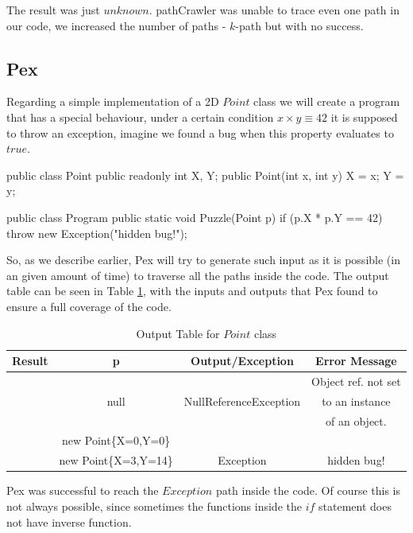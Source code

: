 \documentclass[10pt, conference, compsocconf]{IEEEtran}
\newcommand{\checkK}{\color{ForestGreen}\checkmark}
\newcommand{\cross}{\color{red}\hspace{-3pt}\ding{55}}
\begin{document}
The result was just $unknown$. pathCrawler was unable to trace even one path in our code, we increased the number of paths - $k$-path but with no success.

\subsection{Pex}
Regarding a simple implementation of a 2D $Point$ class we will create a program that has a special behaviour, under a certain condition
$x \times y \equiv 42$ it is supposed to throw an exception, imagine we found a bug when this property evaluates to $true$.

\begin{code}
public class Point  {
  public readonly int X, Y;
  public Point(int x, int y) { X = x; Y = y; }
}

public class Program {
  public static void Puzzle(Point p) {
    if (p.X * p.Y == 42)
        throw new Exception("hidden bug!");
  }
}
\end{code}

So, as we describe earlier, Pex will try to generate such input as it is possible (in an given amount of time) to traverse all the paths inside the code.
The output table can be seen in Table \ref{tab:point}, with the inputs and outputs that Pex found to ensure a full coverage of the code.

\begin{table}[!ht]
\renewcommand{\arraystretch}{1.3}
\setlength{\tabcolsep}{1pt}
\caption{Output Table for $Point$ class}
\label{tab:point}
\centering
\noindent \begin{tabular}{|c|c|c|c|}\hline
Result & p & Output/Exception & Error Message\\\hline
 &  &  & Object ref. not set \\
\cross & null  & NullReferenceException & to an instance \\
 &  &  & of an object.\\\hline
\checkK & new Point\{X=0,Y=0\} & &\\\hline
\cross & new Point\{X=3,Y=14\} & Exception & hidden bug!\\\hline
\end{tabular}
\end{table}

Pex was successful to reach the $Exception$ path inside the code. Of course this is not always possible, since sometimes the functions inside
the $if$ statement does not have inverse function.\\
\end{document}

